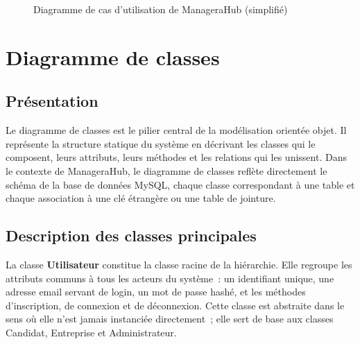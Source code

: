 \documentclass[12pt,a4paper]{report}
\begin{document}
\begin{figure}[H]
\caption{Diagramme de cas d'utilisation de ManageraHub (simplifié)}
\end{figure}

\section{Diagramme de classes}

\subsection{Présentation}

Le diagramme de classes est le pilier central de la modélisation orientée objet. Il représente la structure statique du système en décrivant les classes qui le composent, leurs attributs, leurs méthodes et les relations qui les unissent. Dans le contexte de ManageraHub, le diagramme de classes reflète directement le schéma de la base de données MySQL, chaque classe correspondant à une table et chaque association à une clé étrangère ou une table de jointure.

\subsection{Description des classes principales}

La classe \textbf{Utilisateur} constitue la classe racine de la hiérarchie. Elle regroupe les attributs communs à tous les acteurs du système~: un identifiant unique, une adresse email servant de login, un mot de passe hashé, et les méthodes d'inscription, de connexion et de déconnexion. Cette classe est abstraite dans le sens où elle n'est jamais instanciée directement~; elle sert de base aux classes Candidat, Entreprise et Administrateur.
\end{document}

